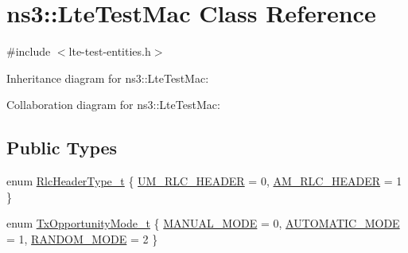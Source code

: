 \hypertarget{classns3_1_1LteTestMac}{}\section{ns3\+:\+:Lte\+Test\+Mac Class Reference}
\label{classns3_1_1LteTestMac}


{\ttfamily \#include $<$lte-\/test-\/entities.\+h$>$}



Inheritance diagram for ns3\+:\+:Lte\+Test\+Mac\+:


Collaboration diagram for ns3\+:\+:Lte\+Test\+Mac\+:
\subsection*{Public Types}
\begin{DoxyCompactItemize}
\item 
enum \hyperlink{classns3_1_1LteTestMac_a1c36ca1572b67fb9614b15fcda18059f}{Rlc\+Header\+Type\+\_\+t} \{ \hyperlink{classns3_1_1LteTestMac_a1c36ca1572b67fb9614b15fcda18059fa7ef65f6d9cc4e0913fd53f034fe164f2}{U\+M\+\_\+\+R\+L\+C\+\_\+\+H\+E\+A\+D\+ER} = 0, 
\hyperlink{classns3_1_1LteTestMac_a1c36ca1572b67fb9614b15fcda18059fa4f8971aa9c5f29c9d7634a06c4270016}{A\+M\+\_\+\+R\+L\+C\+\_\+\+H\+E\+A\+D\+ER} = 1
 \}
\item 
enum \hyperlink{classns3_1_1LteTestMac_a03b97b13baf84069540a16a8a217ff64}{Tx\+Opportunity\+Mode\+\_\+t} \{ \hyperlink{classns3_1_1LteTestMac_a03b97b13baf84069540a16a8a217ff64a1722cbe33cb510a866727d37447cba7a}{M\+A\+N\+U\+A\+L\+\_\+\+M\+O\+DE} = 0, 
\hyperlink{classns3_1_1LteTestMac_a03b97b13baf84069540a16a8a217ff64a63d254ac10feb6294e3079b3457ef6ac}{A\+U\+T\+O\+M\+A\+T\+I\+C\+\_\+\+M\+O\+DE} = 1, 
\hyperlink{classns3_1_1LteTestMac_a03b97b13baf84069540a16a8a217ff64aabd64a8ae115732c295f34305571cf2a}{R\+A\+N\+D\+O\+M\+\_\+\+M\+O\+DE} = 2
 \}
\end{DoxyCompactItemize}
